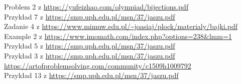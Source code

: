 
 Problem 2 z \url{https://yufeizhao.com/olympiad/bijections.pdf}\\
 Przykład 7 z \url{https://smp.uph.edu.pl/msn/37/jaszu.pdf}\\
 Zadanie 4 z \url{https://www.mimuw.edu.pl/~joasiaj/plock/materialy/bajki.pdf}\\
 Example 2 z \url{https://www.imomath.com/index.php?options=238&lmm=1}\\
 Przykład 5 z \url{https://smp.uph.edu.pl/msn/37/jaszu.pdf}\\
 Przykład 3 z \url{https://smp.uph.edu.pl/msn/37/jaszu.pdf}\\
 \url{https://artofproblemsolving.com/community/c1509h1009792}\\
 Przykład 13 z \url{https://smp.uph.edu.pl/msn/37/jaszu.pdf}\\
